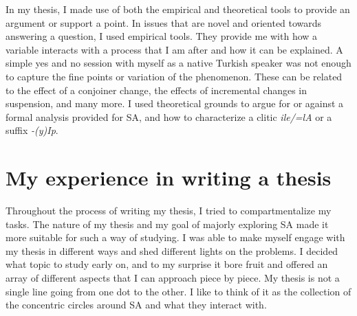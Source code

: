 In my thesis, I made use of both the empirical and theoretical tools to provide an argument or support a point. In issues that are novel and oriented towards answering a question, I used empirical tools. They provide me with how a variable interacts with a process that I am after and how it can be explained. A simple yes and no session with myself as a native Turkish speaker was not enough to capture the fine points or variation of the phenomenon. These can be related to the effect of a conjoiner change, the effects of incremental changes in suspension, and many more. I used theoretical grounds to argue for or against a formal analysis provided for SA, and how to characterize a clitic \textit{ile/=lA} or a suffix \textit{-(y)Ip}. 


\section{My experience in writing a thesis}

Throughout the process of writing my thesis, I tried to compartmentalize my tasks. The nature of my thesis and my goal of majorly exploring SA made it more suitable for such a way of studying. I was able to make myself engage with my thesis in different ways and shed different lights on the problems. I decided what topic to study early on, and to my surprise it bore fruit and offered an array of different aspects that I can approach piece by piece. My thesis is not a single line going from one dot to the other. I like to think of it as the collection of the concentric circles around SA and what they interact with. 
